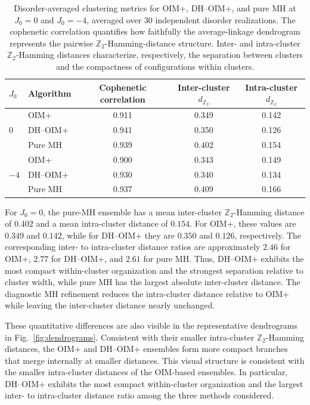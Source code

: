 \documentclass[
reprint,
amsmath,amssymb,
aps,
pre,
floatfix,
]{revtex4-2}
\begin{document}
\begin{table}[t]
\caption{
Disorder-averaged clustering metrics for OIM+, DH--OIM+, and pure MH
at $J_0=0$ and $J_0=-4$, averaged over 30 independent disorder
realizations. The cophenetic correlation quantifies how faithfully the
average-linkage dendrogram represents the pairwise $\mathbb{Z}_2$-Hamming-distance
structure. Inter- and intra-cluster $\mathbb{Z}_2$-Hamming distances characterize,
respectively, the separation between clusters and the compactness of
configurations within clusters.}
\label{tab:distance_metrics}
\begin{ruledtabular}
\begin{tabular}{llccc}
$J_0$ & Algorithm & Cophenetic correlation &
Inter-cluster $d_{\mathbb{Z}_2}$ & Intra-cluster $d_{\mathbb{Z}_2}$ \\
\hline
\multirow{3}{*}{$0$}
 & OIM+      & 0.911 & 0.349 & 0.142 \\
 & DH--OIM+  & 0.941 & 0.350 & 0.126 \\
 & Pure MH   & 0.939 & 0.402 & 0.154 \\
\hline
\multirow{3}{*}{$-4$}
 & OIM+      & 0.900 & 0.343 & 0.149 \\
 & DH--OIM+  & 0.930 & 0.340 & 0.134 \\
 & Pure MH   & 0.937 & 0.409 & 0.166 \\
\end{tabular}
\end{ruledtabular}
\end{table}

For $J_0=0$, the pure-MH ensemble has a mean inter-cluster
$\mathbb{Z}_2$-Hamming distance of $0.402$ and a mean intra-cluster
distance of $0.154$. For OIM+, these values are $0.349$ and $0.142$,
while for DH--OIM+ they are $0.350$ and $0.126$, respectively.
The corresponding inter- to intra-cluster distance ratios are
approximately $2.46$ for OIM+, $2.77$ for DH--OIM+, and $2.61$ for pure
MH. Thus, DH--OIM+ exhibits the most compact within-cluster organization
and the strongest separation relative to cluster width, while pure MH has
the largest absolute inter-cluster distance. The diagnostic MH refinement
reduces the intra-cluster distance relative to OIM+ while leaving the
inter-cluster distance nearly unchanged.

These quantitative differences are also visible in the representative
dendrograms in Fig.~\ref{fig:dendrograms}. Consistent with their smaller
intra-cluster $\mathbb{Z}_2$-Hamming distances, the OIM+ and DH--OIM+
ensembles form more compact branches that merge internally at smaller
distances. This visual structure is consistent with the smaller
intra-cluster distances of the OIM-based ensembles. In particular,
DH--OIM+ exhibits the most compact within-cluster organization and the
largest inter- to intra-cluster distance ratio among the three methods
considered.
\end{document}
